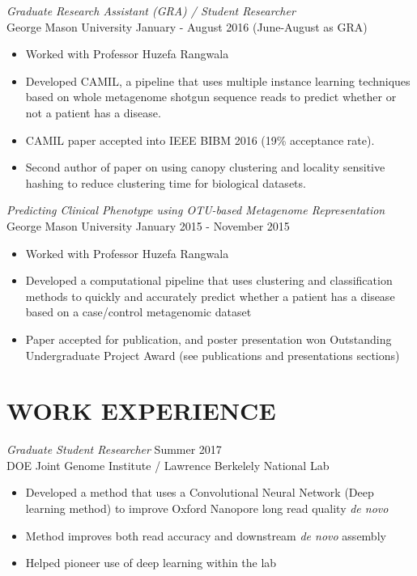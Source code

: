 \documentclass[margin, 10pt]{res} %
\begin{document}
\begin{resume}
{\sl Graduate Research Assistant (GRA) / Student Researcher} \\
George Mason University \hfill January - August 2016 (June-August as GRA)
\begin{itemize} \itemsep -2pt %
\item Worked with Professor Huzefa Rangwala 
\item Developed CAMIL, a pipeline that uses multiple instance learning techniques based on whole metagenome shotgun sequence reads to predict whether or not a patient has a disease.
\item CAMIL paper accepted into IEEE BIBM 2016 (19\% acceptance rate).
\item Second author of paper on using canopy clustering and locality sensitive hashing to reduce clustering time for biological datasets.
\end{itemize}

{\sl Predicting Clinical Phenotype using OTU-based Metagenome Representation} \\
George Mason University  \hfill January 2015 - November 2015
\begin{itemize} \itemsep -2pt %
\item Worked with Professor Huzefa Rangwala
\item Developed a computational pipeline that uses clustering and classification methods to quickly and accurately predict whether a patient has a disease based on a case/control metagenomic dataset
\item Paper accepted for publication, and poster presentation won Outstanding Undergraduate Project Award (see publications and presentations sections)
\end{itemize}

 
\section{WORK EXPERIENCE}

{\sl Graduate Student Researcher} \hfill Summer 2017 \\ DOE Joint Genome Institute / Lawrence Berkelely National Lab

\begin{itemize} \itemsep -2pt %
\item Developed a method that uses a Convolutional Neural Network (Deep learning method) to improve Oxford Nanopore long read quality \emph{de novo}
\item Method improves both read accuracy and downstream \emph{de novo} assembly
\item Helped pioneer use of deep learning within the lab
\end{itemize}



\end{resume}
\end{document}
